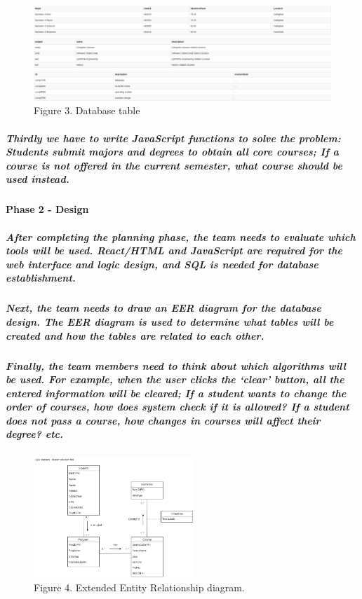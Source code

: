 \documentclass[12pt]{article}
\begin{document}
\begin{figure}[h]
\centering
\includegraphics[width=14cm]{./sqlMajor.png}
\includegraphics[width=14cm]{./course.png}
\includegraphics[width=14cm]{./comp.png}
Figure 3. Database table
\end{figure}

\subparagraph{Thirdly we have to write JavaScript functions to solve the problem: Students submit majors and degrees to obtain all core courses; If a course is not offered in the current semester, what course should be used instead.}

\paragraph{Phase 2 - Design}

\subparagraph{After completing the planning phase, the team needs to evaluate which tools will be used. React/HTML and JavaScript are required for the web interface and logic design, and SQL is needed for database establishment.}

\subparagraph{Next, the team needs to draw an EER diagram for the database design. The EER diagram is used to determine what tables will be created and how the tables are related to each other.}

\subparagraph{Finally, the team members need to think about which algorithms will be used. For example, when the user clicks the ‘clear’ button, all the entered information will be cleared; If a student wants to change the order of courses, how does system check if it is allowed? If a student does not pass a course, how changes in courses will affect their degree? etc.}

\begin{figure}[h]
\centering
\includegraphics[width=6cm]{./EER.png}\\
Figure 4. Extended Entity Relationship diagram.
\end{figure}
\end{document}
